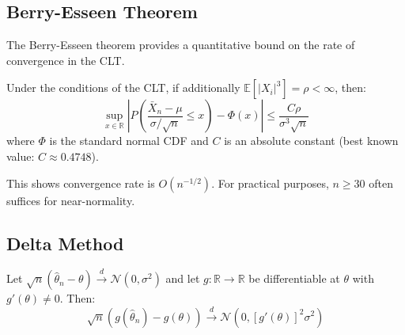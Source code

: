 \subsection{Berry-Esseen Theorem}

The Berry-Esseen theorem provides a quantitative bound on the rate of convergence in the CLT.

\begin{theorem}
Under the conditions of the CLT, if additionally $\mathbb{E}[|X_i|^3] = \rho < \infty$, then:
\begin{equation}
\sup_{x \in \mathbb{R}} \left|P\left(\frac{\bar{X}_n - \mu}{\sigma/\sqrt{n}} \leq x\right) - \Phi(x)\right| \leq \frac{C\rho}{\sigma^3\sqrt{n}}
\end{equation}
where $\Phi$ is the standard normal CDF and $C$ is an absolute constant (best known value: $C \approx 0.4748$).
\end{theorem}

\begin{remark}
This shows convergence rate is $O(n^{-1/2})$. For practical purposes, $n \geq 30$ often suffices for near-normality.
\end{remark}

\subsection{Delta Method}

\begin{theorem}
Let $\sqrt{n}(\hat{\theta}_n - \theta) \xrightarrow{d} \mathcal{N}(0, \sigma^2)$ and let $g: \mathbb{R} \to \mathbb{R}$ be differentiable at $\theta$ with $g'(\theta) \neq 0$. Then:
\begin{equation}
\sqrt{n}(g(\hat{\theta}_n) - g(\theta)) \xrightarrow{d} \mathcal{N}(0, [g'(\theta)]^2\sigma^2)
\end{equation}
\end{theorem}


